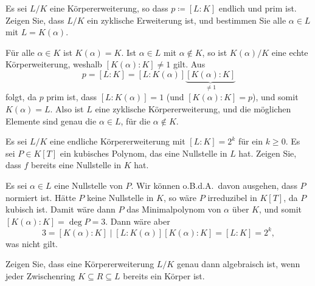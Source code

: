 \begin{question}
  Es sei $L/K$ eine Körpererweiterung, so dass $p \coloneqq [L : K]$ endlich und prim ist.
  Zeigen Sie, dass $L/K$ ein zyklische Erweiterung ist, und bestimmen Sie alle $\alpha \in L$ mit $L = K(\alpha)$.
\end{question}


\begin{solution}
  Für alle $\alpha \in K$ ist $K(\alpha) = K$.
  Ist $\alpha \in L$ mit $\alpha \notin K$, so ist $K(\alpha)/K$ eine echte Körperweiterung, weshalb $[K(\alpha) : K] \neq 1$ gilt.
  Aus
  \[
      p
    = [L : K]
    = [L : K(\alpha)] \underbrace{[K(\alpha) : K]}_{\neq 1}
  \]
  folgt, da $p$ prim ist, dass $[L : K(\alpha)] = 1$ (und $[K(\alpha) : K] = p$), und somit $K(\alpha) = L$.
  Also ist $L$ eine zyklische Körpererweiterung, und die möglichen Elemente sind genau die $\alpha \in L$, für die $\alpha \notin K$.
\end{solution}


\begin{question}
  Es sei $L/K$ eine endliche Körpererweiterung mit $[L : K] = 2^k$ für ein $k \geq 0$.
  Es sei $P \in K[T]$ ein kubisches Polynom, das eine Nullstelle in $L$ hat.
  Zeigen Sie, dass $f$ bereits eine Nullstelle in $K$ hat.
\end{question}


\begin{solution}
  Es sei $\alpha \in L$ eine Nullstelle von $P$.
  Wir können o.B.d.A.\ davon ausgehen, dass $P$ normiert ist.
  Hätte $P$ keine Nullstelle in $K$, so wäre $P$ irreduzibel in $K[T]$, da $P$ kubisch ist.
  Damit wäre dann $P$ das Minimalpolynom von $\alpha$ über $K$, und somit $[K(\alpha) : K] = \deg P = 3$.
  Dann wäre aber
  \[
          3
    =     [K(\alpha) : K]
    \mid  [L : K(\alpha)] [K(\alpha) : K]
    =     [L : K]
    =     2^k,
  \]
  was nicht gilt.
\end{solution}


\begin{question}
  Zeigen Sie, dass eine Körpererweiterung $L/K$ genau dann algebraisch ist, wenn jeder Zwischenring $K \subseteq R \subseteq L$ bereits ein Körper ist.
\end{question}


